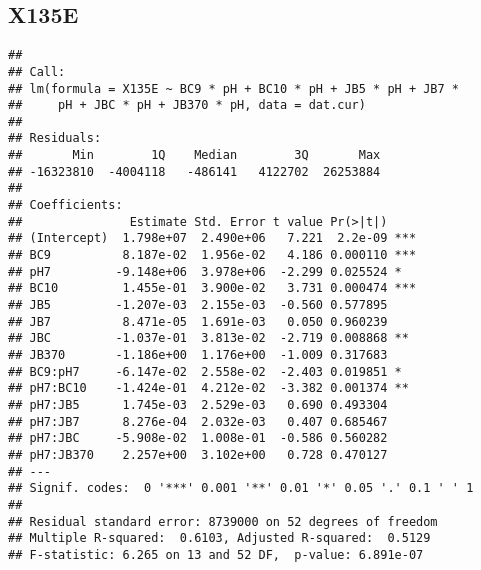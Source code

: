 \documentclass[
]{article}
\newenvironment{Shaded}{\begin{snugshade}}{\end{snugshade}}
\newcommand{\AttributeTok}[1]{\textcolor[rgb]{0.13,0.29,0.53}{#1}}
\newcommand{\DecValTok}[1]{\textcolor[rgb]{0.00,0.00,0.81}{#1}}
\newcommand{\FunctionTok}[1]{\textcolor[rgb]{0.13,0.29,0.53}{\textbf{#1}}}
\newcommand{\NormalTok}[1]{#1}
\newcommand{\OtherTok}[1]{\textcolor[rgb]{0.56,0.35,0.01}{#1}}
\newcommand{\SpecialCharTok}[1]{\textcolor[rgb]{0.81,0.36,0.00}{\textbf{#1}}}
\begin{document}
\hypertarget{x135e}{%
\subsection{X135E}\label{x135e}}

\begin{Shaded}
\end{Shaded}

\begin{verbatim}
## 
## Call:
## lm(formula = X135E ~ BC9 * pH + BC10 * pH + JB5 * pH + JB7 * 
##     pH + JBC * pH + JB370 * pH, data = dat.cur)
## 
## Residuals:
##       Min        1Q    Median        3Q       Max 
## -16323810  -4004118   -486141   4122702  26253884 
## 
## Coefficients:
##               Estimate Std. Error t value Pr(>|t|)    
## (Intercept)  1.798e+07  2.490e+06   7.221  2.2e-09 ***
## BC9          8.187e-02  1.956e-02   4.186 0.000110 ***
## pH7         -9.148e+06  3.978e+06  -2.299 0.025524 *  
## BC10         1.455e-01  3.900e-02   3.731 0.000474 ***
## JB5         -1.207e-03  2.155e-03  -0.560 0.577895    
## JB7          8.471e-05  1.691e-03   0.050 0.960239    
## JBC         -1.037e-01  3.813e-02  -2.719 0.008868 ** 
## JB370       -1.186e+00  1.176e+00  -1.009 0.317683    
## BC9:pH7     -6.147e-02  2.558e-02  -2.403 0.019851 *  
## pH7:BC10    -1.424e-01  4.212e-02  -3.382 0.001374 ** 
## pH7:JB5      1.745e-03  2.529e-03   0.690 0.493304    
## pH7:JB7      8.276e-04  2.032e-03   0.407 0.685467    
## pH7:JBC     -5.908e-02  1.008e-01  -0.586 0.560282    
## pH7:JB370    2.257e+00  3.102e+00   0.728 0.470127    
## ---
## Signif. codes:  0 '***' 0.001 '**' 0.01 '*' 0.05 '.' 0.1 ' ' 1
## 
## Residual standard error: 8739000 on 52 degrees of freedom
## Multiple R-squared:  0.6103, Adjusted R-squared:  0.5129 
## F-statistic: 6.265 on 13 and 52 DF,  p-value: 6.891e-07
\end{verbatim}
\end{document}
